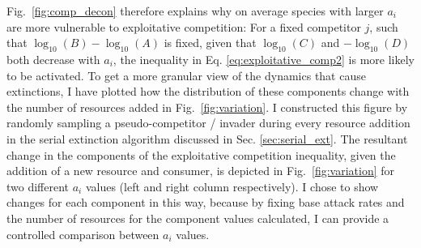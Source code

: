 \documentclass[a4paper]{report}
\DeclareMathOperator{\log}{log}
\begin{document}
{Fig.~\ref{fig:comp_decon} therefore explains why on average species with larger $a_i$ are more vulnerable to exploitative competition: For a fixed competitor $j$, such that $\log_{10}(B)-\log_{10}(A)$ is fixed, given that $\log_{10}(C)$ and $-\log_{10}(D)$ both decrease with $a_i$, the inequality in Eq. \eqref{eq:exploitative_comp2} is more likely to be activated. To get a more granular view of the dynamics that cause extinctions, I have plotted how the distribution of these components change with the number of resources added in Fig.~\ref{fig:variation}. I constructed this figure by randomly sampling a pseudo-competitor / invader during every resource addition in the serial extinction algorithm discussed in Sec. \ref{sec:serial_ext}. The resultant change in the components of the exploitative competition inequality, given the addition of a new resource and consumer, is depicted in Fig.~\ref{fig:variation} for two different $a_i$ values (left and right column respectively). I chose to show changes for each component in this way, because by fixing base attack rates and the number of resources for the component values calculated, I can provide a controlled comparison between $a_i$ values.

}
\end{document}
